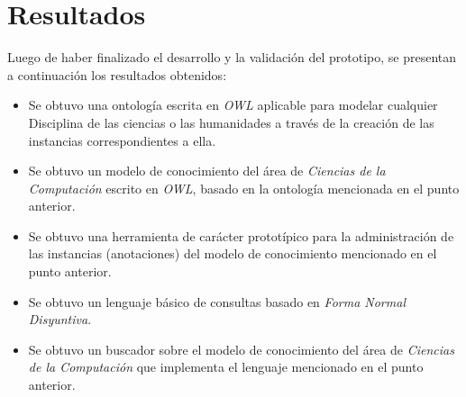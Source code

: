 \chapter{Resultados}
\label{chap:resultados}

Luego de haber finalizado el desarrollo y la validación del prototipo, se presentan a continuación los resultados obtenidos:

\begin{itemize}
    \item Se obtuvo una ontología escrita en \textit{OWL} aplicable para modelar cualquier Disciplina de las ciencias o las humanidades a través de la creación de las instancias correspondientes a ella.
    \item Se obtuvo un modelo de conocimiento del área de \textit{Ciencias de la Computación} escrito en \textit{OWL}, basado en la ontología mencionada en el punto anterior.
    \item Se obtuvo una herramienta de carácter prototípico para la administración de las instancias (anotaciones) del modelo de conocimiento mencionado en el punto anterior.
    \item Se obtuvo un lenguaje básico de consultas basado en \textit{Forma Normal Disyuntiva}.
    \item Se obtuvo un buscador sobre el modelo de conocimiento del área de \textit{Ciencias de la Computación} que implementa el lenguaje mencionado en el punto anterior.
\end{itemize}
